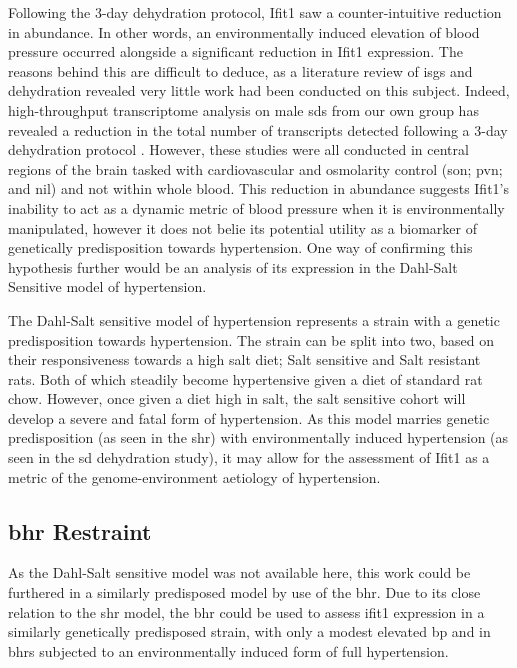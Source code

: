 Following the 3-day dehydration protocol, Ifit1 saw a counter-intuitive reduction in abundance. In other words, an environmentally induced elevation of blood pressure occurred alongside a significant reduction in Ifit1 expression. The reasons behind this are difficult to deduce, as a literature review of \acrshort{isg}s and dehydration revealed very little work had been conducted on this subject. Indeed, high-throughput transcriptome analysis on male \acrshort{sd}s from our own group has revealed a reduction in the total number of transcripts detected following a 3-day dehydration protocol \cite{Qiu2007,Hazell2012}. However, these studies were all conducted in central regions of the brain tasked with cardiovascular and osmolarity control (\acrfull{son}; \acrfull{pvn}; and \acrfull{nil}) and not within whole blood. This reduction in abundance suggests Ifit1's inability to act as a dynamic metric of blood pressure when it is environmentally manipulated, however it does not belie its potential utility as a biomarker of genetically predisposition towards hypertension. One way of confirming this hypothesis further would be an analysis of its expression in the Dahl-Salt Sensitive model of hypertension. 

The Dahl-Salt sensitive model of hypertension represents a strain with a genetic predisposition towards hypertension. The strain can be split into two, based on their responsiveness towards a high salt diet; Salt sensitive and Salt resistant rats. Both of which steadily become hypertensive given a diet of standard rat chow. However, once given a diet high in salt, the salt sensitive cohort will develop a severe and fatal form of hypertension. As this model marries genetic predisposition (as seen in the \acrshort{shr}) with environmentally induced hypertension (as seen in the \acrshort{sd} dehydration study), it may allow for the assessment of Ifit1 as a metric of the genome-environment aetiology of hypertension.
   
\subsection{\acrshort{bhr} Restraint}

As the Dahl-Salt sensitive model was not available here, this work could be furthered in a similarly predisposed model by use of the \acrfull{bhr}. Due to its close relation to the \acrshort{shr} model, the \acrshort{bhr} could be used to assess ifit1 expression in a similarly genetically predisposed strain, with only a modest elevated \acrshort{bp} and in \acrshort{bhr}s subjected to an environmentally induced form of full hypertension. 


